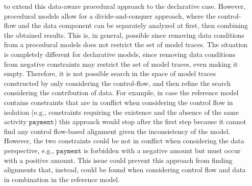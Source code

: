  to extend this data-aware procedural approach to the declarative case. However, procedural models allow for a divide-and-conquer approach, where the control-flow and the data component can be separately analyzed at first, then combining the obtained results. This is, in general, possible since removing data conditions from a procedural models does not restrict the set of model traces. The situation is completely different for declarative models, since removing data conditions from negative constraints may restrict the set of model traces, even making it empty. Therefore, it is not possible search in the space of model traces constructed by only considering the control-flow, and then refine the search considering the contribution of data. For example, in case the reference model contains constraints that are in conflict when considering the control flow in isolation (e.g., constraints requiring the existence and the absence of the same activity $\texttt{payment}$) this approach would stop after the first step because it cannot find any control flow-based alignment given the inconsistency of the model. However, the two constraints could be not in
conflict when considering the data perspective, e.g., $\texttt{payment}$ is forbidden with a negative amount but must occur with a positive amount. This issue could prevent this approach from finding alignments that, instead, could be found when considering control flow and data in combination in the reference model.
\\
\indent
